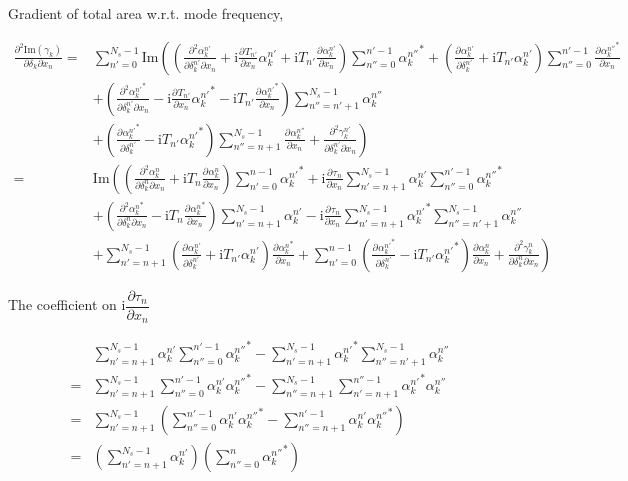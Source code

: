 \documentclass[10pt,fleqn]{article}
\newcommand{\ui}{\mathrm{i}}
\newcommand{\eqar}[1]
{
  \begin{align*}
    #1
  \end{align*}
}
\newcommand{\paren}[1]{{\left({#1}\right)}}
\newcommand{\lparen}[1]{{\left({#1}\right.}}
\newcommand{\rparen}[1]{{\left.{#1}\right)}}
\newcommand{\pdiff}[3][{}]{{\frac{\partial^{#1} {#2}}{\partial {#3}{}^{#1}}}}
\begin{document}
Gradient of total area w.r.t. mode frequency,
\eqar{
  \frac{\partial^2\mathrm{Im}(\gamma_k)}{\partial\delta_k\partial x_n}=&
  \sum_{n'=0}^{N_s-1}\!\!\mathrm{Im}\lparen{
    \paren{
      \frac{\partial^2\alpha_k^{n'}}{\partial\delta_k^{n'}\partial x_n}
      +\ui \pdiff{T_{n'}}{x_n}\alpha_k^{n'}
      +\ui T_{n'}\pdiff{\alpha_k^{n'}}{x_n}}
    \sum_{n''=0}^{n'-1}\!\!{\alpha_k^{n''}}^*
    +\paren{
      \pdiff{\alpha_k^{n'}}{\delta_k^{n'}}+\ui T_{n'}\alpha_k^{n'}}
    \sum_{n''=0}^{n'-1}\!\!\pdiff{{\alpha_k^{n''}}^*}{x_n}
  }\\
  &
  +\paren{
    \frac{\partial^2{\alpha_k^{n'}}^*}{\partial\delta_k^{n'}\partial x_n}
    -\ui\pdiff{T_{n'}}{x_n}{\alpha_k^{n'}}^*
    -\ui T_{n'}\pdiff{{\alpha_k^{n'}}^*}{x_n}
  }\!\!\!\!\sum_{n''=n'+1}^{N_s-1}\!\!\!\!\alpha_k^{n''}
  \\
  &\rparen{
    +\paren{\pdiff{{\alpha_k^{n'}}^*}{\delta_k^{n'}}-\ui T_{n'}{\alpha_k^{n'}}^*}\!\!\!\!\sum_{n''=n+1}^{N_s-1}\!\!\!\!\pdiff{\alpha_k^{n''}}{x_n}
    +\frac{\partial^2\gamma_k^{n'}}{\partial\delta_k^{n'}\partial x_n}}\\
  =&
  \mathrm{Im}\lparen{
    \paren{
      \frac{\partial^2\alpha_k^{n}}{\partial\delta_k^{n}\partial x_n}
      +\ui T_{n}\pdiff{\alpha_k^{n}}{x_n}}
    \sum_{n'=0}^{n-1}\!\!{\alpha_k^{n'}}^*\!\!
    +\ui\pdiff{\tau_{n}}{x_n}\!\!\sum_{n'=n+1}^{N_s-1}\!\!\alpha_k^{n'}
    \!\!\sum_{n''=0}^{n'-1}\!\!{\alpha_k^{n''}}^*
  }\\
  &
  +\paren{
    \frac{\partial^2{\alpha_k^n}^*}{\partial\delta_k^n\partial x_n}
    -\ui T_n\pdiff{{\alpha_k^n}^*}{x_n}
  }\!\!\!\!\sum_{n'=n+1}^{N_s-1}\!\!\!\!\alpha_k^{n'}
  -\ui\pdiff{\tau_n}{x_n}\!\!\sum_{n'=n+1}^{N_s-1}\!\!{\alpha_k^{n'}}^*
  \!\!\!\!\sum_{n''=n'+1}^{N_s-1}\!\!\!\!\alpha_k^{n''}
  \\
  &\rparen{
    +\!\!\!\!\sum_{n'=n+1}^{N_s-1}\!\!\paren{
      \pdiff{\alpha_k^{n'}}{\delta_k^{n'}}+\ui T_{n'}\alpha_k^{n'}}
    \pdiff{{\alpha_k^{n}}^*}{x_n}
    +\sum_{n'=0}^{n-1}\!\!\paren{\pdiff{{\alpha_k^{n'}}^*}{\delta_k^{n'}}-\ui T_{n'}{\alpha_k^{n'}}^*}\pdiff{\alpha_k^{n}}{x_n}
    +\frac{\partial^2\gamma_k^n}{\partial\delta_k^n\partial x_n}}
}
The coefficient on $\ui\dfrac{\partial\tau_n}{\partial x_n}$
\eqar{
  &\sum_{n'=n+1}^{N_s-1}\!\!\alpha_k^{n'}\!\!\sum_{n''=0}^{n'-1}\!\!{\alpha_k^{n''}}^*
  -\sum_{n'=n+1}^{N_s-1}\!\!{\alpha_k^{n'}}^*\!\!\!\!\sum_{n''=n'+1}^{N_s-1}\!\!\!\!\alpha_k^{n''}\\
  =&\sum_{n'=n+1}^{N_s-1}\sum_{n''=0}^{n'-1}\!\!\alpha_k^{n'}{\alpha_k^{n''}}^*
  -\!\!\sum_{n''=n+1}^{N_s-1}\sum_{n'=n+1}^{n''-1}\!\!\!\!{\alpha_k^{n'}}^*\alpha_k^{n''}\\
  =&\sum_{n'=n+1}^{N_s-1}\paren{\sum_{n''=0}^{n'-1}\!\!\alpha_k^{n'}{\alpha_k^{n''}}^*
    -\!\!\sum_{n''=n+1}^{n'-1}\!\!\!\!\alpha_k^{n'}{\alpha_k^{n''}}^*}\\
  =&\paren{\sum_{n'=n+1}^{N_s-1}\!\!\alpha_k^{n'}}\paren{\sum_{n''=0}^{n}\!\!{\alpha_k^{n''}}^*}
}
\end{document}
